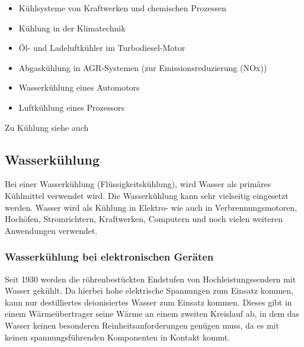 \begin{itemize}
	\item Kühlsysteme von Kraftwerken und chemischen Prozessen
	\item Kühlung in der Klimatechnik
	\item Öl- und Ladeluftkühler im Turbodiesel-Motor
	\item Abgaskühlung in AGR-Systemen (zur Emissionsreduzierung (NOx))
	\item Wasserkühlung eines Automotors
	\item Luftkühlung eines Prozessors
\end{itemize}


Zu Kühlung siehe auch \cite{Kuehlung1,Kuehlung2}

\newpage

\subsection{Wasserkühlung} 

Bei einer Wasserkühlung (Flüssigkeitskühlung), wird Wasser als primäres Kühlmittel verwendet wird. Die Wasserkühlung kann sehr vielseitig eingesetzt werden. Wasser wird als Kühlung in Elektro- wie auch in Verbrennungsmotoren, Hochöfen, Stromrichtern, Kraftwerken, Computern und noch vielen weiteren Anwendungen verwendet.   

\subsubsection{Wasserkühlung bei elektronischen Geräten}

Seit 1930 werden die röhrenbestückten Endstufen von Hochleistungssendern mit Wasser gekühlt. Da hierbei hohe elektrische Spannungen zum Einsatz kommen, kann nur destilliertes deionisiertes Wasser zum Einsatz kommen. Dieses gibt in einem Wärmeübertrager seine Wärme an einem zweiten Kreislauf ab, in dem das Wasser keinen besonderen Reinheitsanforderungen genügen muss, da es mit keinen spannungsführenden Komponenten in Kontakt kommt.

